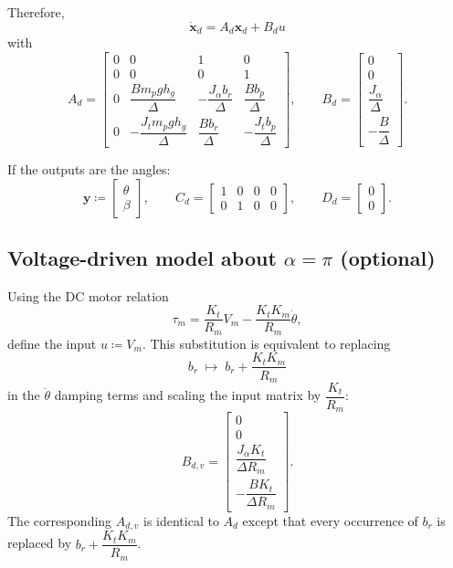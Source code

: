 \documentclass[12pt,a4paper]{article}
\begin{document}
Therefore,
\[
\boxed{\dot{\bm x}_d = A_d \bm x_d + B_d u}
\]
with
\[
A_d=
\begin{bmatrix}
0 & 0 & 1 & 0\\
0 & 0 & 0 & 1\\
0 & \dfrac{B m_p g h_g}{\Delta} & -\dfrac{J_\alpha b_r}{\Delta} & \dfrac{B b_p}{\Delta}\\
0 & -\dfrac{J_t m_p g h_g}{\Delta} & \dfrac{B b_r}{\Delta} & -\dfrac{J_t b_p}{\Delta}
\end{bmatrix},
\qquad
B_d=
\begin{bmatrix}
0\\
0\\
\dfrac{J_\alpha}{\Delta}\\
-\dfrac{B}{\Delta}
\end{bmatrix}.
\]

If the outputs are the angles:
\[
\bm y \coloneqq
\begin{bmatrix}\theta\\ \beta\end{bmatrix},
\qquad
C_d=
\begin{bmatrix}
1&0&0&0\\
0&1&0&0
\end{bmatrix},
\qquad
D_d=
\begin{bmatrix}0\\0\end{bmatrix}.
\]

\subsection{Voltage-driven model about $\alpha=\pi$ (optional)}

Using the DC motor relation
\[
\tau_m=\frac{K_t}{R_m}V_m-\frac{K_tK_m}{R_m}\dot\theta,
\]
define the input $u\coloneqq V_m$. This substitution is equivalent to replacing
\[
b_r \;\mapsto\; b_r+\frac{K_tK_m}{R_m}
\]
in the $\dot\theta$ damping terms and scaling the input matrix by $\dfrac{K_t}{R_m}$:
\[
B_{d,v}=
\begin{bmatrix}
0\\
0\\
\dfrac{J_\alpha K_t}{\Delta R_m}\\
-\dfrac{B K_t}{\Delta R_m}
\end{bmatrix}.
\]
The corresponding $A_{d,v}$ is identical to $A_d$ except that every occurrence of $b_r$ is replaced by
$b_r+\dfrac{K_tK_m}{R_m}$.

\end{document}
